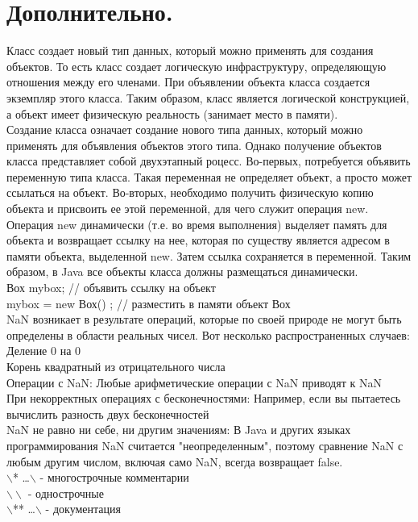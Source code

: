 \section{Дополнительно.}
Класс создает новый тип данных, который можно применять для создания объектов. То есть класс создает логическую инфраструктуру, определяющую отношения между его членами. При объявлении объекта класса создается экземпляр этого класса. Таким образом, класс является логической конструкцией, а объект имеет физическую реальность (занимает место в памяти). 
\\
Создание класса означает создание нового типа данных, который можно применять для объявления объектов этого типа. Однако получение объектов класса представляет собой двухэтапный роцесс. Во-первых, потребуется объявить переменную типа класса. Такая переменная не определяет объект, а просто может ссылаться на объект. Во-вторых, необходимо получить физическую копию объекта и присвоить ее этой переменной, для чего служит операция new. Операция new динамически (т.е. во время выполнения) выделяет память для объекта и возвращает ссылку на нее, которая по существу является адресом в памяти объекта, выделенной new. Затем ссылка сохраняется в переменной. Таким образом, в Java все объекты класса должны размещаться динамически. \\
Вох mybox; // объявить ссылку на объект \\
mybox = new Вох() ; // разместить в памяти объект Вох \\
NaN возникает в результате операций, которые по своей природе не могут быть определены в области реальных чисел. Вот несколько распространенных случаев: \\ 
Деление 0 на 0 \\
Корень квадратный из отрицательного числа \\
Операции с NaN: Любые арифметические операции с NaN приводят к NaN \\
При некорректных операциях с бесконечностями: Например, если вы пытаетесь вычислить разность двух бесконечностей \\
NaN не равно ни себе, ни другим значениям: В Java и других языках программирования NaN считается "неопределенным", поэтому сравнение NaN с любым другим числом, включая само NaN, всегда возвращает false. \\
$\backslash$* \ldots *$\backslash$ - многострочные комментарии \\
$\backslash \backslash$ - однострочные \\
$\backslash$** \ldots *$\backslash$ - документация \\
